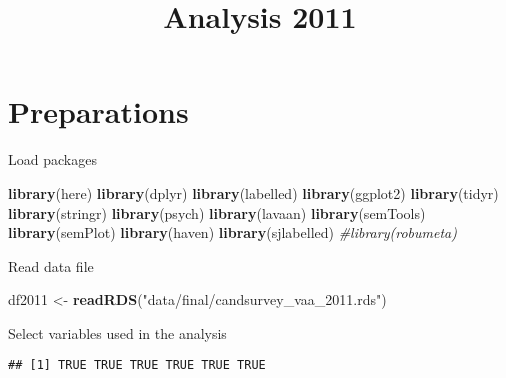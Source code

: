 \documentclass[
]{article}
\title{Analysis 2011}
\author{}
\date{\vspace{-2.5em}}
\newenvironment{Shaded}{\begin{snugshade}}{\end{snugshade}}
\newcommand{\CommentTok}[1]{\textcolor[rgb]{0.56,0.35,0.01}{\textit{#1}}}
\newcommand{\KeywordTok}[1]{\textcolor[rgb]{0.13,0.29,0.53}{\textbf{#1}}}
\newcommand{\NormalTok}[1]{#1}
\newcommand{\OperatorTok}[1]{\textcolor[rgb]{0.81,0.36,0.00}{\textbf{#1}}}
\newcommand{\StringTok}[1]{\textcolor[rgb]{0.31,0.60,0.02}{#1}}
\begin{document}
\maketitle

{
\setcounter{tocdepth}{5}
\tableofcontents
}
\newpage

\hypertarget{preparations}{%
\section{Preparations}\label{preparations}}

Load packages

\begin{Shaded}
\begin{Highlighting}[]
\KeywordTok{library}\NormalTok{(here)}
\KeywordTok{library}\NormalTok{(dplyr)}
\KeywordTok{library}\NormalTok{(labelled)}
\KeywordTok{library}\NormalTok{(ggplot2)}
\KeywordTok{library}\NormalTok{(tidyr)}
\KeywordTok{library}\NormalTok{(stringr)}
\KeywordTok{library}\NormalTok{(psych)}
\KeywordTok{library}\NormalTok{(lavaan)}
\KeywordTok{library}\NormalTok{(semTools)}
\KeywordTok{library}\NormalTok{(semPlot)}
\KeywordTok{library}\NormalTok{(haven)}
\KeywordTok{library}\NormalTok{(sjlabelled)}
\CommentTok{#library(robumeta)}
\end{Highlighting}
\end{Shaded}

Read data file

\begin{Shaded}
\begin{Highlighting}[]
\NormalTok{df2011 <-}\StringTok{ }\KeywordTok{readRDS}\NormalTok{(}\StringTok{"data/final/candsurvey_vaa_2011.rds"}\NormalTok{)}
\end{Highlighting}
\end{Shaded}

Select variables used in the analysis

\begin{Shaded}
\end{Shaded}

\begin{verbatim}
## [1] TRUE TRUE TRUE TRUE TRUE TRUE
\end{verbatim}
\end{document}
